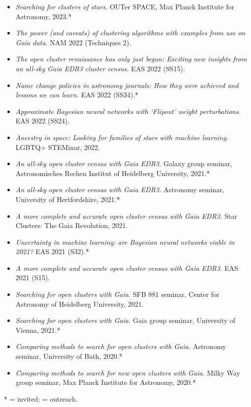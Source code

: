\documentclass[12pt, letterpaper]{hunt-cv}
\begin{document}
\begin{itemize}
    \item \emph{Searching for clusters of stars.} OUTer SPACE, Max Planck Institute for Astronomy, 2023.*\cross
    \item \emph{The power (and caveats) of clustering algorithms with examples from use on Gaia data.} NAM 2022 (Techniques 2).
    \item \emph{The open cluster renaissance has only just begun: Exciting new insights from an all-sky Gaia EDR3 cluster census.} EAS 2022 (SS15).
    \item \emph{Name change policies in astronomy journals: How they were achieved and lessons we can learn.} EAS 2022 (SS34).*
    \item \emph{Approximate Bayesian neural networks with `Flipout' weight perturbations.} EAS 2022 (SS24).
    \item \emph{Ancestry in space: Looking for families of stars with machine learning.} LGBTQ+ STEMinar, 2022.\cross
    \item \emph{An all-sky open cluster census with Gaia EDR3.} Galaxy group seminar, Astronomisches Rechen Institut of Heidelberg University, 2021.*
    \item \emph{An all-sky open cluster census with Gaia EDR3.} Astronomy seminar, University of Hertfordshire, 2021.*
    \item \emph{A more complete and accurate open cluster census with Gaia EDR3.} Star Clusters: The Gaia Revolution, 2021.
    \item \emph{Uncertainty in machine learning: are Bayesian neural networks viable in 2021?} EAS 2021 (S32).*
    \item \emph{A more complete and accurate open cluster census with Gaia EDR3.} EAS 2021 (S15).
    \item \emph{Searching for open clusters with Gaia.} SFB 881 seminar, Center for Astronomy of Heidelberg University, 2021.
    \item \emph{Searching for open clusters with Gaia.} Gaia group seminar, University of Vienna, 2021.*
    \item \emph{Comparing methods to search for open clusters with Gaia.} Astronomy seminar, University of Bath, 2020.*
    \item \emph{Comparing methods to search for new open clusters with Gaia.} Milky Way group seminar, Max Planck Institute for Astronomy, 2020.*
\end{itemize}

* = invited; \cross = outreach.
\end{document}
